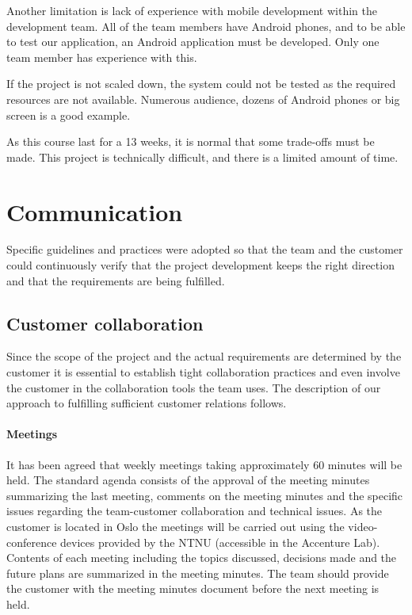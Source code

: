 Another limitation is lack of experience with mobile development within the development team. All of the team members have Android phones, and to be able to test our application, an Android application must be developed. Only one team member has experience with this. 

If the project is not scaled down, the system could not be tested as the required resources are not available. Numerous audience, dozens of Android phones or big screen is a good example.

As this course last for a 13 weeks, it is normal that some trade-offs must be made.
This project is technically difficult, and there is a limited amount of time. 


\section{Communication}
Specific guidelines and practices were adopted so that the team and the customer could continuously verify that the project development keeps the right direction and that the requirements are being fulfilled.

\subsection{Customer collaboration}
Since the scope of the project and the actual requirements are determined by the customer it is essential to establish tight collaboration practices and even involve the customer in the collaboration tools the team uses. The description of our approach to fulfilling sufficient customer relations follows.

\paragraph{Meetings}
It has been agreed that weekly meetings taking approximately 60 minutes will be held. The standard agenda consists of the approval of the meeting minutes summarizing the last meeting, comments on the meeting minutes and the specific issues regarding the team-customer collaboration and technical issues. As the customer is located in Oslo the meetings will be carried out using the video-conference devices provided by the NTNU (accessible in the Accenture Lab). Contents of each meeting including the topics discussed, decisions made and the future plans are summarized in the meeting minutes. The team should provide the customer with the meeting minutes document before the next meeting is held.

